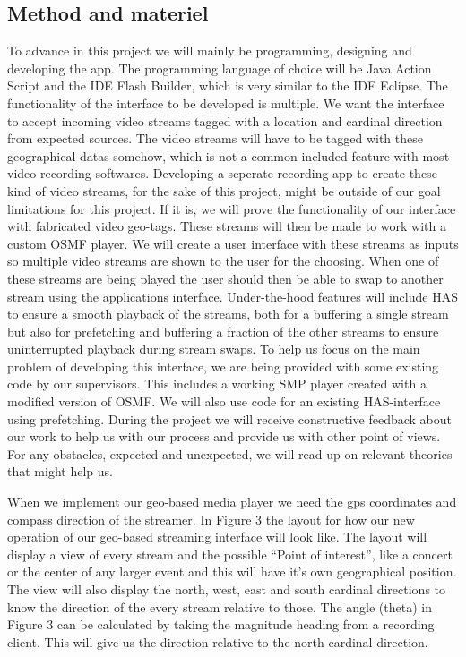 \documentclass[9pt,a4paper]{acmproc}
\begin{document}
\subsection{Method and materiel}
To advance in this project we will mainly be programming, designing and developing the app. The programming language of choice will be Java Action Script and the IDE Flash Builder, which is very similar to the IDE Eclipse. The functionality of the interface to be developed is multiple. We want the interface to accept incoming video streams tagged with a location and cardinal direction from expected sources. The video streams will have to be tagged with these geographical datas somehow, which is not a common included feature with most video recording softwares. Developing a seperate recording app to create these kind of video streams, for the sake of this project, might be outside of our goal limitations for this project. If it is, we will prove the functionality of our interface with fabricated video geo-tags. These streams will then be made to work with a custom OSMF player. We will create a user interface with these streams as inputs so multiple video streams are shown to the user for the choosing. When one of these streams are being played the user should then be able to swap to another stream using the applications interface. 
Under-the-hood features will include HAS to ensure a smooth playback of the streams, both for a buffering a single stream but also for prefetching and buffering a fraction of the other streams to ensure uninterrupted playback during stream swaps. 
To help us focus on the main problem of developing this interface, we are being provided with some existing code by our supervisors. This includes a working SMP player created with a modified version of OSMF. We will also use code for an existing HAS-interface using prefetching. \cite[s.~317-326]{qualbranch}
During the project we will receive constructive feedback about our work to help us with our process and provide us with other point of views. For any obstacles, expected and unexpected, we will read up on relevant theories that might help us.

When we implement our geo-based media player we need the gps coordinates and compass direction of the streamer. In Figure 3 the layout for how our new operation of our geo-based streaming interface will look like. The layout will display a view of every stream and the possible “Point of interest”, like a concert or the center of any larger event and this will have it’s own geographical position. The view will also display the north, west, east and south cardinal directions to know the direction of the every stream relative to those. The angle (theta) in Figure 3 can be calculated by taking the magnitude heading from a recording client. This will give us the direction relative to the north cardinal direction.
\end{document}
